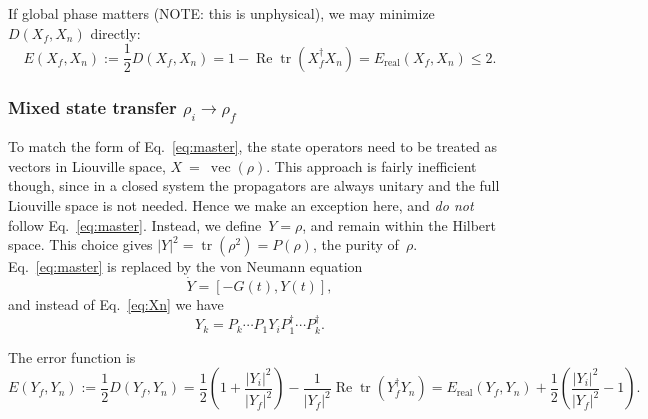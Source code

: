 \documentclass[aps, pra, a4paper, longbibliography]{revtex4}
\newcommand{\be}{\begin{equation}}
\newcommand{\ee}{\end{equation}}
\newcommand{\braket}[2]{\left \langle #1 | #2 \right \rangle}
\newcommand{\ketbra}[2]{\left| #1 \right \rangle \left \langle #2 \right|}
\newcommand{\comm}[2]{\left[ #1, #2 \right]}
\DeclareMathOperator{\tr}{tr}
\DeclareMathOperator{\re}{Re}
\DeclareMathOperator{\cvec}{vec}
\begin{document}
If global phase matters (NOTE: this is unphysical), we may minimize
$D(X_f, X_n)$ directly:
\be
E(X_f, X_n)
:= \frac{1}{2} D(X_f, X_n)
= 1 -\re \tr(X_f^\dagger X_n)
= E_\text{real}(X_f, X_n) \le 2.
\ee



\subsubsection{Mixed state transfer $\rho_i \to \rho_f$}
\label{sec:closed-mixed}

To match the form of Eq.~\eqref{eq:master},
the state operators need to be treated as vectors in Liouville space,
$X~=~\cvec(\rho)$.
This approach is fairly inefficient though, since in a closed system the
propagators are always unitary and the full Liouville space is not
needed. Hence we make an exception here, and \emph{do not} follow Eq.~\eqref{eq:master}.
Instead, we define~$Y = \rho$, and remain within the Hilbert space.
This choice gives $|Y|^2 = \tr(\rho^2) = P(\rho)$, the purity of~$\rho$.
Eq.~\eqref{eq:master} is replaced by the von Neumann equation
\be
\dot{Y} = \comm{-G(t)}{Y(t)},
\ee
and instead of Eq.~\eqref{eq:Xn} we have
\be
Y_k = P_k \cdots P_1 Y_i P_1^\dagger \cdots P_k^\dagger.
\ee

The error function is
\be
E(Y_f, Y_n)
:= \frac{1}{2} D(Y_f, Y_n)
= \frac{1}{2}\left(1 +\frac{|Y_i|^2}{|Y_f|^2}\right) -\frac{1}{|Y_f|^2} \re \tr(Y_f^\dagger Y_n)
= E_\text{real}(Y_f, Y_n) +\frac{1}{2}\left(\frac{|Y_i|^2}{|Y_f|^2} -1\right).
\ee


\begin{comment}
The goal here is to minimize state operator distance
$D(X_f, X_n) = D(\rho_f, \rho_n)$.
$|X|^2$~is equivalent to the purity of the state:
\be
|X|^2
= |\cvec(\rho)|^2
= |\rho|^2
= \tr(\rho^2)
= P(\rho).
\ee
Unitary propagation conserves purity, hence (X1) holds, and we can
simply maximize the fidelity
\be
f(X_f, X_n)
= \frac{1}{P(\rho_f)} (\re) (\tr) \left( X_f^\dagger  P_n \cdots P_1 X_i \right).
\ee
Furthermore, the fidelity is strictly nonnegative since the
state operators are positive:
\be
0 \le f(X_f, X_n) \le \sqrt{\frac{P(\rho_i)}{P(\rho_f)}}.
\ee
If either $\rho_f$ or $\rho_i$ is pure,
$\rho = \ketbra{\psi}{\psi}$,
we have $|\rho|^2 = \braket{\psi}{\psi}^2 = 1$, and
the diagram simplifies by splitting up.
\end{comment}
\end{document}
